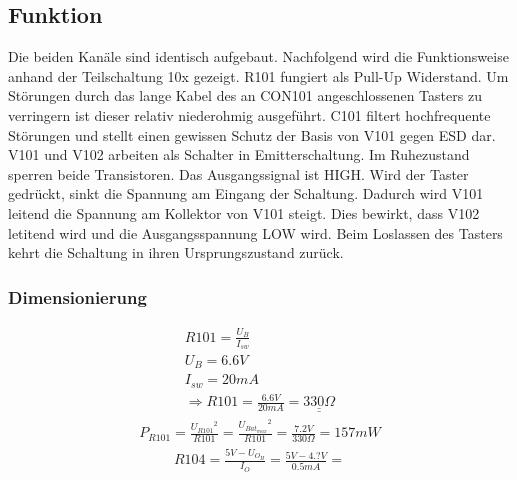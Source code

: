\subsection{Funktion}
Die beiden Kanäle sind identisch aufgebaut. Nachfolgend wird die Funktionsweise anhand der Teilschaltung 10x gezeigt. R101 fungiert als Pull-Up Widerstand. Um Störungen durch das lange Kabel des an CON101 angeschlossenen Tasters zu verringern ist dieser relativ niederohmig ausgeführt. C101 filtert hochfrequente Störungen und stellt einen gewissen Schutz der Basis von V101 gegen ESD dar. V101 und V102 arbeiten als Schalter in Emitterschaltung. Im Ruhezustand sperren beide Transistoren. Das Ausgangssignal ist HIGH. Wird der Taster gedrückt, sinkt die Spannung am Eingang der Schaltung. Dadurch wird V101 leitend die Spannung am Kollektor von V101 steigt. Dies bewirkt, dass V102 letitend wird und die Ausgangsspannung LOW wird. Beim Loslassen des Tasters kehrt die Schaltung in ihren Ursprungszustand zurück. 

\subsubsection{Dimensionierung}
\[ \begin{array}{l}
R101 = \frac{U_B}{I_{sw}}\\
U_B = 6.6 V\\
I_{sw} = 20 mA\\
\Rightarrow R101 = \frac{6.6V}{20mA} = \underline{\underline{330 \Omega}}
\end{array} \]
\[ \begin{array}{l}
P_{R101} = \frac{{U_{R101}}^2}{R101} = \frac{{U_{Bat_{max}}}^2}{R101} = \frac{7.2 V}{330 \Omega} = 157 mW
\end{array} \]
%
\[ \begin{array}{l}
R104 = \frac{5 V - U_{O_H}}{I_O} = \frac{5 V - 4.? V}{0.5 mA} = 
\end{array} \]

